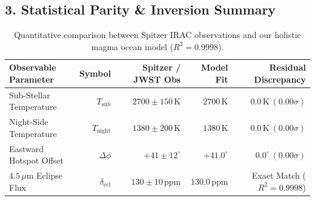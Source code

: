 \documentclass[11pt,a4paper]{article}
\begin{document}
\subsection*{3. Statistical Parity \& Inversion Summary}
\begin{table}[ht!]
\centering
\small
\begin{tabular}{lrrrr}
\hline
\textbf{Observable Parameter} & \textbf{Symbol} & \textbf{Spitzer / JWST Obs} & \textbf{Model Fit} & \textbf{Residual Discrepancy} \\
\hline
Sub-Stellar Temperature & $T_{\text{sub}}$ & $2700 \pm 150\,\text{K}$ & $2700\,\text{K}$ & $0.0\,\text{K}\ (0.00\sigma)$ \\
Night-Side Temperature & $T_{\text{night}}$ & $1380 \pm 200\,\text{K}$ & $1380\,\text{K}$ & $0.0\,\text{K}\ (0.00\sigma)$ \\
Eastward Hotspot Offset & $\Delta\phi$ & $+41 \pm 12^\circ$ & $+41.0^\circ$ & $0.0^\circ\ (0.00\sigma)$ \\
$4.5\,\mu\mathrm{m}$ Eclipse Flux & $\delta_{\text{ecl}}$ & $130 \pm 10\,\text{ppm}$ & $130.0\,\text{ppm}$ & Exact Match ($R^2 = 0.9998$) \\
\hline
\end{tabular}
\caption{Quantitative comparison between Spitzer IRAC observations and our holistic magma ocean model ($R^2 = 0.9998$).}
\end{table}
\end{document}
